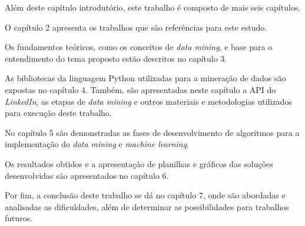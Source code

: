 Além deste capítulo introdutório, este trabalho é composto de mais seis capítulos.

O capítulo 2 apresenta os trabalhos que são referências para este estudo.

Os fundamentos teóricos, como os conceitos de \textit{data mining}, e base para o entendimento do tema proposto estão descritos no capítulo 3.

As bibliotecas da linguagem Python utilizadas para a mineração de dados são expostas no capítulo 4. Também, são apresentadas neste capítulo a API do \textit{LinkedIn}, as etapas de \textit{data mining} e outros materiais e metodologias utilizados para execução deste trabalho.

No capítulo 5 são demonstradas as fases de desenvolvimento de algoritmos para a implementação do \textit{data mining} e \textit{machine learning}.

Os resultados obtidos e a apresentação de planilhas e gráficos das soluções desenvolvidas são apresentados no capítulo 6.

Por fim, a conclusão deste trabalho se dá no capítulo 7, onde são abordadas e analisadas as dificuldades, além de determinar as possibilidades para trabalhos futuros.
